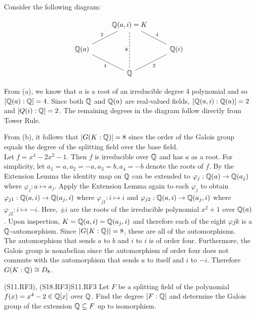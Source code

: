 \documentclass[../../AlgebraQualSolutions.tex]{subfiles}
\begin{document}
\begin{solution}
	Consider the following diagram:

	\[
		\begin{tikzcd}
			& \Q(a,i) = K & \\
			\Q(a) \ar[ur,no head, "2"] & & \Q(i) \ar[ul,no head, "4"']\\
			& \Q \ar[ul, no head, "4"] \ar[ur, no head, "2"'] \ar[uu, dashed, no head, "8"] &
		\end{tikzcd}
		\]

	From (a), we know that $a$ is a root of an irreducible degree 4 polynomial and so $[\mathbb{Q}(a): \mathbb{Q}] = 4$. Since both $\mathbb{Q}$ and $\mathbb{Q}(a)$ are real-valued fields, $[\mathbb{Q}(a,i): \mathbb{Q}(a)] = 2$ and $[Q(i): \mathbb{Q}] = 2$. The remaining degrees in the diagram follow directly from Tower Rule. \\
\end{solution}
\begin{solution}
	From (b), it follows that $|G(K:\mathbb{Q})| = 8$ since the order of the Galois group equals the degree of the splitting field over the base field.\\
	
	Let $f = x^4 - 2x^2 - 1$. Then $f$ is irreducible over $\mathbb{Q}$ and has $a$ as a root. For simplicity, let $a_1 = a,a_2 = -a ,a_3 = b,a_4 = -b$ denote the roots of $f$. By the Extension Lemma the identity map on $\mathbb{Q}$ can be extended to $\varphi_j: \mathbb{Q}(a) \to \mathbb{Q}(a_j)$ where $\varphi_j: a \mapsto a_j$. Apply the Extension Lemma again to each $\varphi_j$ to obtain $\varphi_{j1}: \mathbb{Q}(a,i) \to \mathbb{Q}(a_j,i)$ where $\varphi_{j1}: i\mapsto i$ and $\varphi_{j2}: \mathbb{Q}(a,i) \to \mathbb{Q}(a_j,i)$ where $\varphi_{j2}: i \mapsto -i$. Here, $\pm i$ are the roots of the irreducible polynomial $x^2 + 1$ over $\mathbb{Q}(a)$. Upon inspection, $K = \mathbb{Q}(a,i) = \mathbb{Q}(a_j,i)$ and therefore each of the eight $\varphi{jk}$ is a $\mathbb{Q}$-automorphism. Since $|G(K:\mathbb{Q})| = 8$, these are all of the automorphisms.\\

	The automorphism that sends $a$ to $b$ and $i$ to $i$ is of order four. Furthermore, the Galois group is nonabelian since the automorphism of order four does not commute with the automorphism that sends $a$ to itself and $i$ to $-i$. Therefore $G(K:\mathbb{Q}) \cong D_8$.
\end{solution}

\begin{prob}{(S11.RF3), (S18.RF3)}{S11.RF3}
    Let $F$ be a splitting field of the polynomial $f(x) = x^4 - 2 \in \mathbb{Q}[x]$ over $\mathbb{Q}$. Find the degree $[F: \mathbb{Q}]$ and determine the Galois group of the extension $\mathbb{Q} \subseteq F$ up to isomorphism.
\end{prob}
\end{document}
